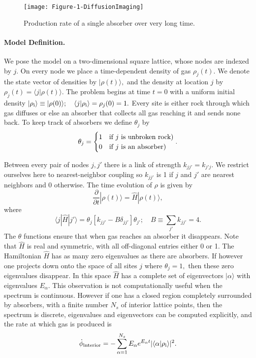 \documentclass[english,notitlepage,twocolumn]{revtex4-1}
\def\ro{|\rho_{\rm i}\rangle}
\begin{document}
\begin{figure}
\centering{}\texttt{[image: Figure-1-DiffusionImaging]}\caption{Production rate of a single absorber over very long time.\label{fig:OneSink}}
\end{figure}


\paragraph{Model Definition.}

We pose the model on a two-dimensional square lattice, whose nodes
are indexed by $j.$ On every node we place a time-dependent density
of gas $\rho_{j}(t).$ We denote the state vector of densities by
$|\rho(t)\rangle,$ and the density at location $j$ by $\rho_{j}(t)=\langle j|\rho(t)\rangle$.
The problem begins at time $t=0$ with a uniform initial density $\ro\equiv|\rho(0)\rangle;\quad\langle j\ro=\rho_{j}(0)=1.$
Every site is either rock through which gas diffuses or else an absorber
that collects all gas reaching it and sends none back. To keep track
of absorbers we define $\theta_{j}$ by 
\begin{equation}
\theta_{j}=\begin{cases}
1 & \text{if \ensuremath{j} is unbroken rock)}\\
0 & \text{if \ensuremath{j} is an absorber) }
\end{cases}.\label{eq:theta}
\end{equation}

Between every pair of nodes $j,j'$ there is a link of strength $k_{jj'}=k_{j'j}$.
We restrict ourselves here to nearest-neighbor coupling so $k_{jj'}$
is 1 if $j$ and $j'$ are nearest neighbors and 0 otherwise. The
time evolution of $\rho$ is given by
\begin{equation}
\frac{\partial}{\partial t}|\rho\left(t\right)\rangle=\hat{H}|\rho\left(t\right)\rangle,\label{eq:dH}
\end{equation}
where
\begin{equation}
\langle j|\hat{H}|j'\rangle=\theta_{j}\left[k_{jj'}-B\delta_{jj'}\right]\theta_{j'};\quad B\equiv\sum_{j'}k_{jj'}=4.\label{eq:ki}
\end{equation}
 The $\theta$ functions ensure that when gas reaches an absorber
it disappears. Note that $\hat{H}$ is real and symmetric, with all
off-diagonal entries either 0 or 1. The Hamiltonian $\hat{H}$ has
as many zero eigenvalues as there are absorbers. If however one projects
down onto the space of all sites $j$ where $\theta_{j}=1,$ then
these zero eigenvalues disappear. In this space $\hat{H}$ has a complete
set of eigenvectors $|\alpha\rangle$ with eigenvalues $E_{\alpha}$.
This observation is not computationally useful when the spectrum is
continuous. However if one has a closed region completely surrounded
by absorbers, with a finite number $N_{s}$ of interior lattice points,
then the spectrum is discrete, eigenvalues and eigenvectors can be
computed explicitly, and the rate at which gas is produced is 
\begin{equation}
\dot{\phi}_{{\rm interior}}=-\sum_{\alpha=1}^{N_{s}}E_{\alpha}e^{E_{\alpha}t}|\langle\alpha\ro|^{2}.\label{eq:phi0}
\end{equation}
\end{document}
